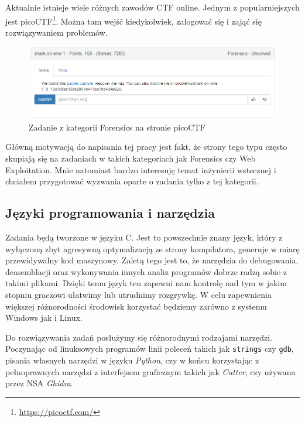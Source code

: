 \documentclass[polish,12pt]{aghthesis}
\begin{document}
Aktualnie istnieje wiele różnych zawodów CTF online. Jednym z popularniejszych
jest \mbox{picoCTF}\footnote{\url{https://picoctf.com/}}.
Można tam wejść kiedykolwiek, zalogować się i zająć się rozwiązywaniem problemów.

\begin{figure}[ht]
    \centering
    \includegraphics[width=15cm]{picoctf}
    \caption{Zadanie z kategorii Forensics na stronie picoCTF}
    \label{fig:picoctf}
\end{figure}

Główną motywacją do napisania tej pracy jest fakt, że strony tego typu często skupiają
się na zadaniach w takich kategoriach jak Forensics czy Web Exploitation.
Mnie natomiast bardzo interesuję temat inżynierii wstecznej i chciałem
przygotować wyzwania oparte o zadania tylko z tej kategorii.

\subsection{Języki programowania i narzędzia}

Zadania będą tworzone w języku C. Jest to powszechnie znany język, który
z wyłączoną zbyt agresywną optymalizacją ze strony kompilatora, generuje
w miarę przewidywalny kod maszynowy. Zaletą tego jest to, że narzędzia
do debugowania, deasemblacji oraz wykonywania innych analiz programów
dobrze radzą sobie z takimi plikami. Dzięki temu język ten
zapewni nam kontrolę nad tym w jakim stopniu graczowi ułatwimy
lub utrudnimy rozgrywkę. W celu zapewnienia większej różnorodności
środowisk korzystać będziemy zarówno z systemu Windows jak i Linux.

Do rozwiązywania zadań posłużymy się różnorodnymi rodzajami narzędzi.
Poczynając od linuksowych programów linii poleceń takich jak \texttt{strings}
czy \texttt{gdb}, pisania własnych narzędzi w języku \emph{Python},
czy w końcu korzystając z pełnoprawnych narzędzi z interfejsem graficznym takich
jak \emph{Cutter}, czy używana przez NSA \emph{Ghidra}.

\clearpage
\end{document}
